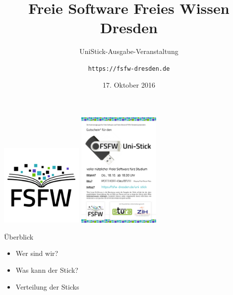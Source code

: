 \documentclass[t]{beamer}
\title{Freie Software Freies Wissen Dresden}
\subtitle{UniStick-Ausgabe-Veranstaltung}
\author{\texttt{https://fsfw-dresden.de}}
\date{17. Oktober 2016}
\begin{document}




\begin{frame}[label=p1]
  \begin{center}%
\vspace*{-1em}
\includegraphics[width=4cm]{img-src/fsfw-logo-with-text}
\hspace{1cm}
\includegraphics[width=4cm]{img-src/gutschein-seite-1}\\
\vspace{1em}
  \end{center}
\end{frame}


\begin{frame}[label=ol]{\color{fg}Überblick}
  \begin{itemize}
  \item Wer sind wir?
  \item Was kann der Stick?
  \item Verteilung der Sticks
  \end{itemize}
\end{frame}
\end{document}
